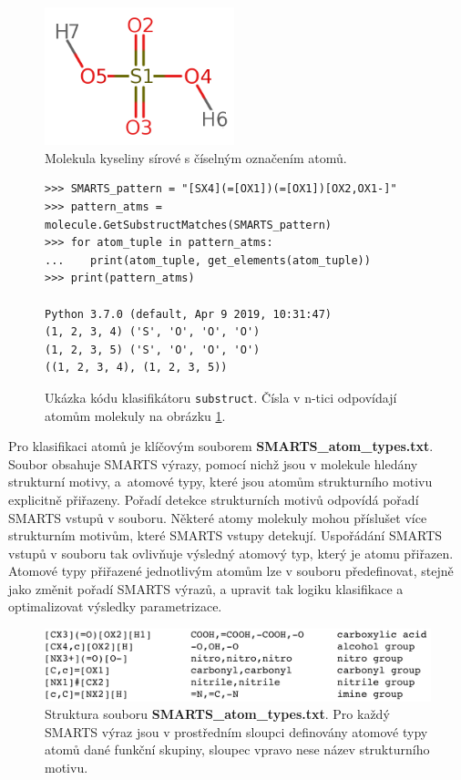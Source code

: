 \begin{figure}[h]
    \centering
    \includegraphics[width=5.5cm]{pictures/sirovka.png}
    \caption{Molekula kyseliny sírové s číselným označením atomů.}
    \label{h2so5}
\end{figure}



\begin{figure}
\begin{lstlisting}
>>> SMARTS_pattern = "[SX4](=[OX1])(=[OX1])[OX2,OX1-]"
>>> pattern_atms = molecule.GetSubstructMatches(SMARTS_pattern)
>>> for atom_tuple in pattern_atms:
...    print(atom_tuple, get_elements(atom_tuple))
>>> print(pattern_atms)

Python 3.7.0 (default, Apr 9 2019, 10:31:47)
(1, 2, 3, 4) ('S', 'O', 'O', 'O')
(1, 2, 3, 5) ('S', 'O', 'O', 'O')
((1, 2, 3, 4), (1, 2, 3, 5))
\end{lstlisting}
\caption{Ukázka kódu klasifikátoru \texttt{substruct}. Čísla v n-tici odpovídají atomům molekuly na obrázku \ref{h2so5}.     }
\end{figure}

\bigskip
Pro klasifikaci atomů je klíčovým souborem \textbf{SMARTS\_atom\_types.txt}. Soubor obsahuje SMARTS výrazy, pomocí nichž jsou v molekule hledány strukturní motivy, a~atomové typy, které jsou atomům strukturního motivu explicitně přiřazeny.
Pořadí detekce strukturních motivů odpovídá pořadí SMARTS vstupů v souboru. Některé atomy molekuly mohou příslušet více strukturním motivům, které SMARTS vstupy detekují. Uspořádání SMARTS vstupů v souboru tak ovlivňuje výsledný atomový typ, který je atomu přiřazen. Atomové typy přiřazené jednotlivým atomům lze v souboru předefinovat, stejně jako změnit pořadí SMARTS výrazů, a upravit tak logiku klasifikace a optimalizovat výsledky parametrizace.
\begin{figure}[h]
    \centering
    \includegraphics[width=15cm]{pictures/SMARTS_legend_2.png}
    \caption{Struktura souboru \textbf{SMARTS\_atom\_types.txt}. Pro každý SMARTS výraz jsou v prostředním sloupci definovány atomové typy atomů dané funkční skupiny, sloupec vpravo nese název strukturního motivu.}
    \label{SMARTS_file}
\end{figure}


